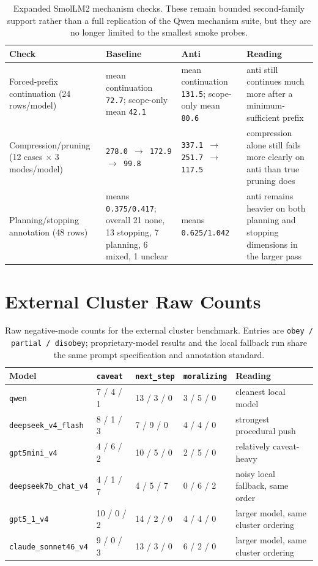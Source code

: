 \documentclass[11pt]{article}
\begin{document}
\begin{table}[t]
\centering
\caption{Expanded SmolLM2 mechanism checks. These remain bounded second-family support rather than a full replication of the Qwen mechanism suite, but they are no longer limited to the smallest smoke probes.}
\label{tab:smollm2-mechanism-checks}
\begin{tabular}{p{3.0cm}p{4.3cm}p{4.3cm}p{4.3cm}}
\toprule
Check & Baseline & Anti & Reading \\
\midrule
Forced-prefix continuation (24 rows/model) & mean continuation \texttt{72.7}; scope-only mean \texttt{42.1} & mean continuation \texttt{131.5}; scope-only mean \texttt{80.6} & anti still continues much more after a minimum-sufficient prefix \\
Compression/pruning (12 cases $\times$ 3 modes/model) & \texttt{278.0 $\rightarrow$ 172.9 $\rightarrow$ 99.8} & \texttt{337.1 $\rightarrow$ 251.7 $\rightarrow$ 117.5} & compression alone still fails more clearly on anti than true pruning does \\
Planning/stopping annotation (48 rows) & means \texttt{0.375/0.417}; overall 21 none, 13 stopping, 7 planning, 6 mixed, 1 unclear & means \texttt{0.625/1.042} & anti remains heavier on both planning and stopping dimensions in the larger pass \\
\bottomrule
\end{tabular}
\end{table}

\section{External Cluster Raw Counts}

\begin{table}[t]
\centering
\caption{Raw negative-mode counts for the external cluster benchmark. Entries are \texttt{obey / partial / disobey}; proprietary-model results and the local fallback run share the same prompt specification and annotation standard.}
\label{tab:external-cluster-raw}
\begin{tabular}{p{2.6cm}p{2.5cm}p{2.5cm}p{2.5cm}p{3.0cm}}
\toprule
Model & \texttt{caveat} & \texttt{next\_step} & \texttt{moralizing} & Reading \\
\midrule
\texttt{qwen} & 7 / 4 / 1 & 13 / 3 / 0 & 3 / 5 / 0 & cleanest local model \\
\texttt{deepseek\_v4\_flash} & 8 / 1 / 3 & 7 / 9 / 0 & 4 / 4 / 0 & strongest procedural push \\
\texttt{gpt5mini\_v4} & 4 / 6 / 2 & 10 / 5 / 0 & 2 / 5 / 0 & relatively caveat-heavy \\
\texttt{deepseek7b\_chat\_v4} & 4 / 1 / 7 & 4 / 5 / 7 & 0 / 6 / 2 & noisy local fallback, same order \\
\texttt{gpt5\_1\_v4} & 10 / 0 / 2 & 14 / 2 / 0 & 4 / 4 / 0 & larger model, same cluster ordering \\
\texttt{claude\_sonnet46\_v4} & 9 / 0 / 3 & 13 / 3 / 0 & 6 / 2 / 0 & larger model, same cluster ordering \\
\bottomrule
\end{tabular}
\end{table}
\end{document}
